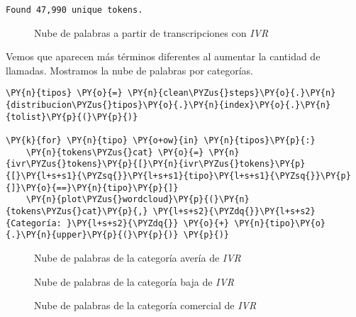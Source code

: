     \begin{Verbatim}[commandchars=\\\{\}]
Found 47,990 unique tokens.
    \end{Verbatim}


\begin{figure}[!ht]
	\centering
    \caption{Nube de palabras a partir de transcripciones con \textit{IVR}}
    \label{fig:cloudivr}
\end{figure} 

    
    Vemos que aparecen más términos diferentes al aumentar la cantidad de llamadas.
Mostramos la nube de palabras por categorías.

    \begin{tcolorbox}[breakable, size=fbox, boxrule=1pt, pad at break*=1mm,colback=cellbackground, colframe=cellborder]
\begin{Verbatim}[commandchars=\\\{\}]
\PY{n}{tipos} \PY{o}{=} \PY{n}{clean\PYZus{}steps}\PY{o}{.}\PY{n}{distribucion\PYZus{}tipos}\PY{o}{.}\PY{n}{index}\PY{o}{.}\PY{n}{tolist}\PY{p}{(}\PY{p}{)}

\PY{k}{for} \PY{n}{tipo} \PY{o+ow}{in} \PY{n}{tipos}\PY{p}{:}
    \PY{n}{tokens\PYZus{}cat} \PY{o}{=} \PY{n}{ivr\PYZus{}tokens}\PY{p}{[}\PY{n}{ivr\PYZus{}tokens}\PY{p}{[}\PY{l+s+s1}{\PYZsq{}}\PY{l+s+s1}{tipo}\PY{l+s+s1}{\PYZsq{}}\PY{p}{]}\PY{o}{==}\PY{n}{tipo}\PY{p}{]}
    \PY{n}{plot\PYZus{}wordcloud}\PY{p}{(}\PY{n}{tokens\PYZus{}cat}\PY{p}{,} \PY{l+s+s2}{\PYZdq{}}\PY{l+s+s2}{Categoría: }\PY{l+s+s2}{\PYZdq{}} \PY{o}{+} \PY{n}{tipo}\PY{o}{.}\PY{n}{upper}\PY{p}{(}\PY{p}{)} \PY{p}{)}
\end{Verbatim}
\end{tcolorbox}

\begin{figure}[!ht]
	\centering
    \caption{Nube de palabras de la categoría avería de \textit{IVR}}
    \label{fig:cloudivr_ave}
\end{figure} 


\begin{figure}[!ht]
	\centering
    \caption{Nube de palabras de la categoría baja de \textit{IVR}}
    \label{fig:cloudivr_baja}
\end{figure} 

\begin{figure}[!ht]
	\centering
    \caption{Nube de palabras de la categoría comercial de \textit{IVR}}
    \label{fig:cloudivr_comercial}
\end{figure} 

